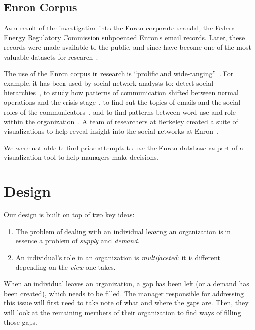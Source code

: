 \documentclass[journal]{vgtc}                %
\begin{document}
\subsection{Enron Corpus}

As a result of the investigation into the Enron corporate scandal, the Federal Energy Regulatory Commission subpoenaed Enron's email records. Later, these records were made available to the public, and since have become one of the most valuable datasets for research~\cite{networkanalysis2015hardin}. 

The use of the Enron corpus in research is ``prolific and wide-ranging''~\cite{networkanalysis2015hardin}. For example, it has been used by social network analysts to: detect social hierarchies~\cite{rowe2007automated}, to study how patterns of communication shifted between normal operations and the crisis stage~\cite{diesner2005communication,diesner2005exploration},  to find out the topics of emails and the social roles of the communicators~\cite{mccallum2007topic}, and to find patterns between word use and role within the organization~\cite{keila2005structure}. A team of researchers at Berkeley created a suite of visualizations to help reveal insight into the social networks at Enron~\cite{heer2005exploring}. 

We were not able to find prior attempts to use the Enron database as part of a visualization tool to help managers make decisions. 

\section{Design}
\label{sec:design}

Our design is built on top of two key ideas:

\begin{enumerate}
\item The problem of dealing with an individual leaving an organization is in essence a problem of \emph{supply} and \emph{demand}. 
\item An individual's role in an organization is \emph{multifaceted}: it is different depending on the \emph{view} one takes.
\end{enumerate}

When an individual leaves an organization, a gap has been left (or a demand has been created), which needs to be filled. The manager responsible for addressing this issue will first need to take note of what and where the gaps are. Then, they will look at the remaining members of their organization to find ways of filling those gaps.
\end{document}
